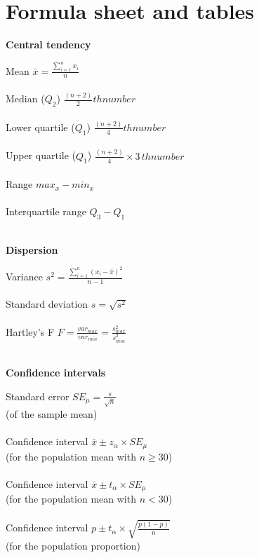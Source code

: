 \section{Formula sheet and tables}
\label{formulasheet}

\begin{minipage}[t]{.45\textwidth}
\begin{center}
    \textbf{Central tendency}
\end{center}
\hline
\answerskip
Mean \hfill $\bar{x} = \frac{\sum^n_{i = 1} x_i}{n}$ \\
\\
Median ($Q_2$) \hfill $\frac{(n + 2)}{2}th number$ \\
\\
Lower quartile ($Q_1$) \hfill $\frac{(n + 2)}{4}th number$ \\
\\
Upper quartile ($Q_1$) \hfill $\frac{(n + 2)}{4} \times 3\, th number$ \\
\\
Range \hfill $max_x - min_x$ \\
\\
Interquartile range \hfill $Q_3 - Q_1$ \\
\\
\begin{center}
    \textbf{Dispersion}
\end{center}
\hline
\answerskip
Variance \hfill $s^2 = \frac{\sum^n_{i = 1} (x_i - \bar{x})^2}{n - 1}$ \\
\\
Standard deviation \hfill $s = \sqrt{s^2}$ \\
\\
Hartley's F \hfill $F = \frac{var_{max}}{var_{min}} = \frac{s^2_{max}}{s^2_{min}}$\\
\\
\begin{center}
    \textbf{Confidence intervals}
\end{center}
\hline
\answerskip
Standard error \hfill $SE_\mu = \frac{s}{\sqrt{n}}$ \\
{\scriptsize (of the sample mean)}\\
\\
Confidence interval \hfill $\bar{x} \pm z_\alpha \times SE_\mu$ \\
{\scriptsize (for the population mean with $n \geq 30$)}\\
\\
Confidence interval \hfill $\bar{x} \pm t_\alpha \times SE_\mu$ \\
{\scriptsize (for the population mean with $n < 30$)}\\
\\
Confidence interval \hfill $p \pm t_\alpha \times \sqrt{\frac{p(1 - p)}{n}}$ \\
{\scriptsize (for the population proportion)}\\
\end{minipage}
